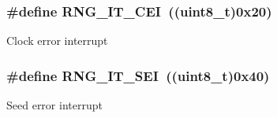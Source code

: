 \subsubsection[{R\+N\+G\+\_\+\+I\+T\+\_\+\+C\+E\+I}]{\setlength{\rightskip}{0pt plus 5cm}\#define R\+N\+G\+\_\+\+I\+T\+\_\+\+C\+E\+I~((uint8\+\_\+t)0x20)}\label{group___r_n_g__interrupts__definition_ga8dabf5f116a92e59d18a224d14882927}
Clock error interrupt \hypertarget{group___r_n_g__interrupts__definition_ga2343cb323912a036fa46b081bbe751bc}{}
\subsubsection[{R\+N\+G\+\_\+\+I\+T\+\_\+\+S\+E\+I}]{\setlength{\rightskip}{0pt plus 5cm}\#define R\+N\+G\+\_\+\+I\+T\+\_\+\+S\+E\+I~((uint8\+\_\+t)0x40)}\label{group___r_n_g__interrupts__definition_ga2343cb323912a036fa46b081bbe751bc}
Seed error interrupt 